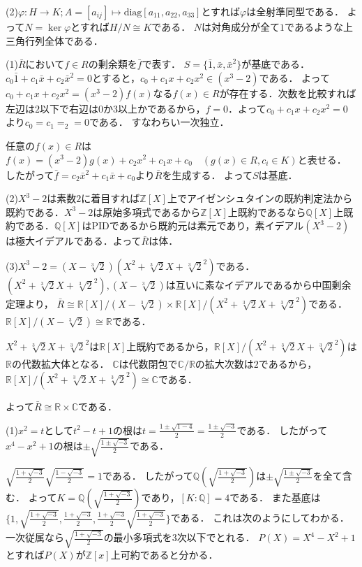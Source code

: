 \documentclass[
		book,
		head_space=20mm,
		foot_space=20mm,
		gutter=10mm,
		line_length=190mm
]{jlreq}
\begin{document}
(2)$\varphi\colon H\rightarrow K;A=[a_{ij}]\mapsto \mathrm{diag}[a_{11},a_{22},a_{33}]$とすれば$\varphi$は全射準同型である．
よって$N=\ker \varphi$とすれば$H/N\cong K$である．
$N$は対角成分が全て$1$であるような上三角行列全体である．

(1)$\bar{R}$において$f\in R$の剰余類を$\bar f$で表す．
$S=\{\bar 1,\bar x,\bar x^2\}$が基底である．
$c_0\bar 1+c_1\bar x+c_2\bar x^2=0$とすると，$c_0+c_1x+c_2x^2\in (x^3-2)$である．
よって$c_0+c_1x+c_2x^2=(x^3-2)f(x)$なる$f(x)\in R$が存在する．次数を比較すれば左辺は$2$以下で右辺は$0$か$3$以上かであるから，$f=0$．よって$c_0+c_1x+c_2x^2=0$より$c_0=c_1=_2=0$である．
すなわちい一次独立．

任意の$f(x)\in R$は$f(x)=(x^3-2)g(x)+c_2x^2+c_1x+c_0\quad(g(x)\in R,c_i\in K)$と表せる．
したがって$\bar f= c_2 \bar x^2 +c_1\bar x+c_0$より$\bar R$を生成する．
よって$S$は基底．

(2)$X^3-2$は素数$2$に着目すれば$\mathbb{Z}[X]$上でアイゼンシュタインの既約判定法から既約である．$X^3-2$は原始多項式であるから$\mathbb{Z}[X]$上既約であるなら$\mathbb{Q}[X]$上既約である．$\mathbb{Q}[X]$はPIDであるから既約元は素元であり，素イデアル$(X^3-2)$は極大イデアルである．よって$\bar{R}$は体．

(3)$X^3-2=(X-\sqrt[3]{2})(X^2+\sqrt[3]{2}X+\sqrt[3]{2}^2)$である．
$(X^2+\sqrt[3]{2}X+\sqrt[3]{2}^2),(X-\sqrt[3]{2})$は互いに素なイデアルであるから中国剰余定理より，
$\bar R\cong \mathbb{R}[X]/(X-\sqrt[3]{2})\times \mathbb{R}[X]/(X^2+\sqrt[3]{2}X+\sqrt[3]{2}^2)$である．
$\mathbb{R}[X]/(X-\sqrt[3]{2})\cong \mathbb{R}$である．

$X^2+\sqrt[3]{2}X+\sqrt[3]{2}^2$は$\mathbb{R}[X]$上既約であるから，$\mathbb{R}[X]/(X^2+\sqrt[3]{2}X+\sqrt[3]{2}^2)$は$\mathbb{R}$の代数拡大体となる．
$\mathbb{C}$は代数閉包で$\mathbb{C}/\mathbb{R}$の拡大次数は$2$であるから，$\mathbb{R}[X]/(X^2+\sqrt[3]{2}X+\sqrt[3]{2}^2)\cong \mathbb{C}$である．

よって$\bar{R}\cong \mathbb{R}\times \mathbb{C}$である．

(1)$x^2=t$として$t^2-t+1$の根は$t=\frac{1\pm\sqrt{1-4}}{2}=\frac{1\pm\sqrt{-3}}{2}$である．
したがって$x^4-x^2+1$の根は$\pm\sqrt{\frac{1\pm\sqrt{-3}}{2}}$である．

$\sqrt{\frac{1+\sqrt{-3}}{2}}\sqrt{\frac{1-\sqrt{-3}}{2}}=1$である．
したがって$\mathbb{Q}(\sqrt{\frac{1+\sqrt{-3}}{2}})$は$\pm\sqrt{\frac{1\pm\sqrt{-3}}{2}}$を全て含む．
よって$K=\mathbb{Q}(\sqrt{\frac{1+\sqrt{-3}}{2}})$であり，$[K:\mathbb{Q}]=4$である．
また基底は$\{ 1,\sqrt{\frac{1+\sqrt{-3}}{2}},\frac{1+\sqrt{-3}}{2},\frac{1+\sqrt{-3}}{2}\sqrt{\frac{1+\sqrt{-3}}{2}}\}$である．
これは次のようにしてわかる．
一次従属なら$\sqrt{\frac{1+\sqrt{-3}}{2}}$の最小多項式を$3$次以下でとれる．
$P(X)=X^4-X^2+1$とすれば$P(X)$が$\mathbb{Z}[x]$上可約であると分かる．
\end{document}
